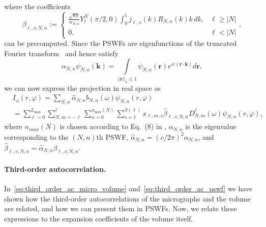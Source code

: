 \documentclass[12pt]{article}
\newcommand{\1}{\mathbf{1}}
\newcommand{\mb}{\mathbf}
\newcommand{\tamir}{x}
\theoremstyle{plain}
\theoremstyle{definition}
\theoremstyle{remark}
\theoremstyle{plain}
\theoremstyle{remark}
\theoremstyle{plain}
\theoremstyle{plain}
\begin{document}
where the coefficients
\begin{equation} \label{eq:beta}
\beta_{\ell,s;N,n} := \left\{\begin{array}{ll} \frac{\sqrt{8\pi}}{\alpha_{N,n}}Y_{\ell}^{N}(\pi/2,0)\int_0^1j_{\ell,s}(k)R_{N,n}(k)k\, dk, & \ell\geq |N|\\ 0, & \ell<|N|\end{array}\right.,
\end{equation}
can be precomputed.
Since the PSWFs are eigenfunctions of the truncated Fourier transform~\cite{landa2017steerable} and hence satisfy 
\begin{equation}
\label{eq:PSWF_defn_eq}
\alpha_{N,n}\psi_{N,n}(\mb k) = \int\limits_{||\mb r||_2\leq 1} \psi_{N,n}(\mb r)e^{\iota c(\mb r\cdot\mb k)}d\mb r,
\end{equation} 
we can now express the projection in real space as
\begin{align} \label{eq:proj_expansion}
&I_{\omega}(r,\varphi) = \sum_{N,n}\widehat{\alpha}_{N,n}b_{N,n}(\omega)\psi_{N,n}(r,\varphi)\\
&= \sum_{\ell=0}^{L_{\text{max}}}\sum_{N,m=-\ell}^{\ell}\sum_{n=0}^{n_{\text{max}}(N)}\sum_{s=1}^{S(\ell)}\tamir_{\ell,m,s}\widehat\beta_{\ell,s;N,n}D_{N,m}^{\ell}(\omega)\psi_{N,n}(r,\varphi), \nonumber 
\end{align}
where $n_{max}(N)$ is chosen according to Eq.~(8) in \cite{landa2017steerable}, $\alpha_{N,n}$ is the eigenvalue corresponding to the $(N,n)$th PSWF, $\widehat{\alpha}_{N,n} = (c/2\pi)^2\alpha_{N,n}$, and $\widehat\beta_{\ell,s;N,n}=\widehat\alpha_{N,n}\beta_{\ell,s;N,n}$.

\paragraph{Third-order autocorrelation.}
In~\eqref{eq:third_order_ac_micro_volume} and~\eqref{eq:third_order_ac_pswf} we have shown how the third-order autocorrelations of the micrographs and the volume are related, and how we can present them in PSWFs. Now, we relate these expressions to the expansion coefficients of the volume itself.
\end{document}
